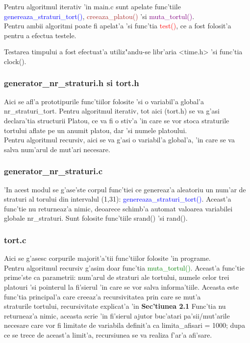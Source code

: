 \documentclass{article}
\begin{document}
Pentru algoritmul iterativ 'in main.c sunt apelate func'tiile \\
\textcolor{blue}{genereaza\_straturi\_tort()}, \textcolor{brown}{creeaza\_platou()} 'si \textcolor{purple}{muta\_tortul()}.\\

Pentru ambii algoritmi poate fi apelat'a 'si func'tia \textcolor{red}{test()}, ce a fost folosit'a pentru a efectua testele.

Testarea timpului a fost efectuat'a utiliz"andu-se libr'aria <time.h> 'si func'tia clock().

\subsubsection{generator\_nr\_straturi.h si tort.h}

Aici se afl'a prototipurile func'tiilor folosite 'si o variabil'a global'a nr\_straturi\_tort.
Pentru algoritmul iterativ, tot aici (tort.h) se va g'asi declara'tia structurii Platou, ce va fi o stiv'a 'in care se vor stoca straturile tortului aflate pe un anumit platou, dar 'si numele platoului.\\
Pentru algoritmul recursiv, aici se va g'asi o variabil'a global'a, 'in care se va salva num'arul de mut'ari necesare.

\subsubsection{generator\_nr\_straturi.c}

'In acest modul se g'ase'ste corpul func'tiei ce genereaz'a aleatoriu un num'ar de straturi al torului din intervalul (1,31): \textcolor{blue}{genereaza\_straturi\_tort()}. Aceast'a func'tie nu returneaz'a nimic, deoarece schimb'a automat valoarea variabilei globale nr\_straturi.
Sunt folosite func'tiile srand() 'si rand().


\subsubsection{tort.c}

Aici se g'asesc corpurile majorit'a'tii func'tiilor folosite 'in programe.\\

Pentru algoritmul recursiv g'asim doar func'tia \textcolor{green}{muta\_tortul()}. Aceast'a func'tie prime'ste ca parametrii: num'arul de straturi ale tortului, numele celor trei platouri 'si pointerul la fi'sierul 'in care se vor salva informa'tiile.
Aceasta este func'tia principal'a care creeaz'a recursivitatea prin care se mut'a \\straturile tortului, recursivitate explicat'a 'in \textbf{Sec'tiunea 2.1}
Func'tia nu returneaz'a nimic, aceasta scrie 'in fi'sierul ajutor buc'atari pa'sii/mut'arile necesare care vor fi limitate de variabila definit'a ca limita\_afisari = 1000; dupa ce se trece de aceast'a limit'a, recursiunea se va realiza f'ar'a afi'sare.\\
\end{document}
